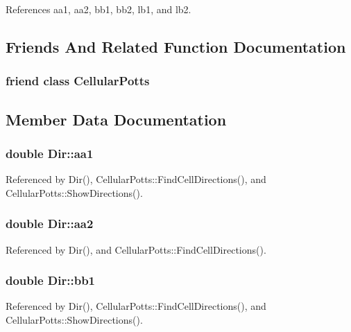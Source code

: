 References aa1, aa2, bb1, bb2, lb1, and lb2.



\subsection{Friends And Related Function Documentation}
\subsubsection[{Cellular\-Potts}]{\setlength{\rightskip}{0pt plus 5cm}friend class {\bf Cellular\-Potts}\hspace{0.3cm}{\ttfamily [friend]}}\label{classDir_ac0d1ad5d66ebb242178dd5da9c9d6fca}


\subsection{Member Data Documentation}
\subsubsection[{aa1}]{\setlength{\rightskip}{0pt plus 5cm}double Dir\-::aa1}\label{classDir_aed210344e39cb7edd401559719b01881}


Referenced by Dir(), Cellular\-Potts\-::\-Find\-Cell\-Directions(), and Cellular\-Potts\-::\-Show\-Directions().

\subsubsection[{aa2}]{\setlength{\rightskip}{0pt plus 5cm}double Dir\-::aa2}\label{classDir_a915e16caa261f904806ec252866a2f2c}


Referenced by Dir(), and Cellular\-Potts\-::\-Find\-Cell\-Directions().

\subsubsection[{bb1}]{\setlength{\rightskip}{0pt plus 5cm}double Dir\-::bb1}\label{classDir_a0be1015ba39907391c063a0b5698a160}


Referenced by Dir(), Cellular\-Potts\-::\-Find\-Cell\-Directions(), and Cellular\-Potts\-::\-Show\-Directions().

